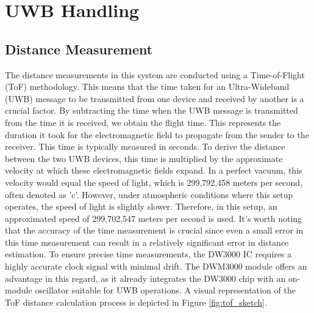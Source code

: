 \chapter{UWB Handling}

\section{Distance Measurement}
The distance measurements in this system are conducted using a Time-of-Flight (ToF) methodology. This means that the time taken for an Ultra-Wideband (UWB) message to be transmitted from one device and received by another is a crucial factor. By subtracting the time when the UWB message is transmitted from the time it is received, we obtain the flight time. This represents the duration it took for the electromagnetic field to propagate from the sender to the receiver. This time is typically measured in seconds.
\vspace{4pt}
\newline
To derive the distance between the two UWB devices, this time is multiplied by the approximate velocity at which these electromagnetic fields expand. In a perfect vacuum, this velocity would equal the speed of light, which is 299,792,458 meters per second, often denoted as 'c'. However, under atmospheric conditions where this setup operates, the speed of light is slightly slower. Therefore, in this setup, an approximated speed of 299,702,547 meters per second is used. 
\vspace{4pt}
\newline
It's worth noting that the accuracy of the time measurement is crucial since even a small error in this time measurement can result in a relatively significant error in distance estimation. To ensure precise time measurements, the DW3000 IC requires a highly accurate clock signal with minimal drift. The DWM3000 module offers an advantage in this regard, as it already integrates the DW3000 chip with an on-module oscillator suitable for UWB operations.
A visual representation of the ToF distance calculation process is depicted in Figure \ref{fig:tof_sketch}.

